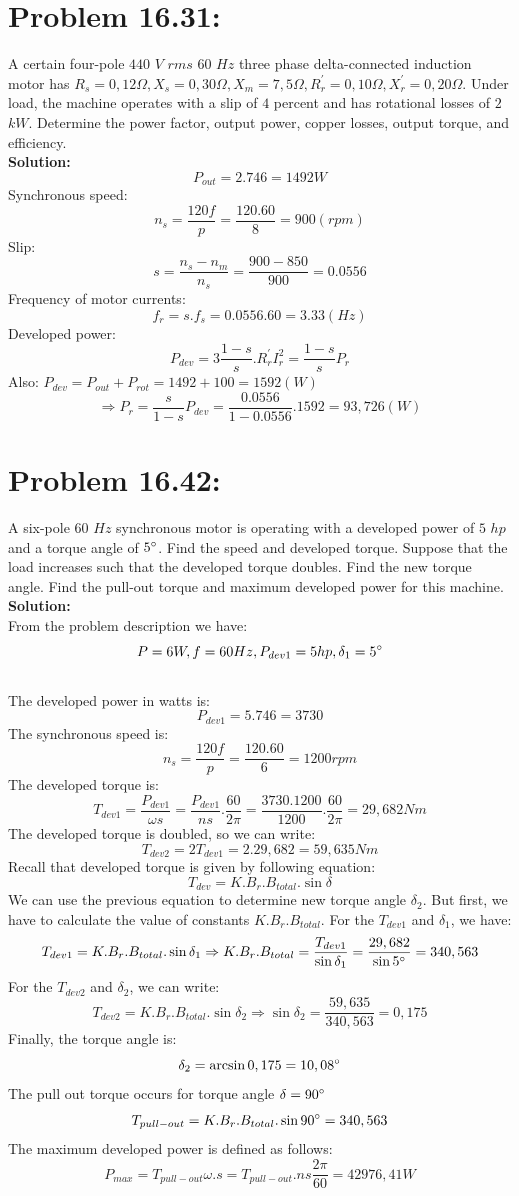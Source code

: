 \documentclass[9pt]{extarticle}
\begin{document}
\section*{Problem 16.31:}
A certain four-pole $440$ $V$ $rms$ $60$ $Hz$ three
phase delta-connected induction motor has
 $R_{s} = 0,12\Omega, X_{s} = 0,30\Omega,X_{m} = 7,5\Omega,R_{r}^{'} = 0,10\Omega,
 X_{r}^{'}= 0,20 \Omega$.
 Under load, the machine operates with a 
slip of $4$ percent and has rotational losses of 
$2$ $kW$. Determine the power factor, output 
power, copper losses, output torque, and 
efficiency.
\\ \textbf{Solution:}
$$P_{out}=2.746=1492W$$
Synchronous speed:
$$n_{s}=\frac{120f}{p}=\frac{120.60}{8}=900(rpm)$$
Slip:
$$s=\frac{n_{s}-n_{m}}{n_{s}}=\frac{900-850}{900}=0.0556$$
Frequency of motor currents:
$$f_{r}=s.f_{s}=0.0556.60=3.33 (Hz)$$
Developed power:
$$P_{dev}=3\frac{1-s}{s}.R_{r}^{'}I_{r}^{2}=\frac{1-s}{s}P_{r}$$
Also: $P_{dev}=P_{out}+P_{rot}=1492+100=1592 (W)$
$$\Rightarrow P_{r}=\frac{s}{1-s}P_{dev}=\frac{0.0556}{1-0.0556}.1592=93,726(W)$$
\section*{Problem 16.42:}
A six-pole $60$ $Hz$ synchronous motor is operating with a developed power of $5$ $hp$ and a torque angle of $5 \degree$. 
Find the speed and developed torque. Suppose that the load increases such that the developed torque doubles.
Find the new torque angle. Find the pull-out torque and maximum developed power for this machine.
\\ \textbf{Solution:}
\\ From the problem description we have:
$$P=6W, f=60 Hz, P_{dev1}=5hp, \delta_{1}=5\degree$$
\\The developed power in watts is:
$$P_{dev1}=5.746=3730$$
The synchronous speed is:
$$n_{s}=\frac{120f}{p}=\frac{120.60}{6}=1200 rpm$$
The developed torque is:
$$T_{dev1}=\frac{P_{dev1}}{\omega s}=\frac{P_{dev1}}{ns}.\frac{60}{2\pi}=\frac{3730.1200}{1200}.\frac{60}{2\pi}=29,682 Nm$$
The developed torque is doubled, so we can write:
$$T_{dev2}=2T_{dev1}=2.29,682=59,635 Nm$$
Recall that developed torque is given by following equation:
$$T_{dev}=K.B_{r}.B_{total}.\sin{\delta}$$
We can use the previous equation to determine new torque angle $\delta_{2}$. But first, we have to calculate the value of constants $K.B_{r}.B_{total}$.
For the $T_{dev1}$ and $\delta_{1}$, we have:
$$T_{dev1}=K.B_{r}.B_{total}.\sin{\delta_{1}}\Rightarrow K.B_{r}.B_{total}=\frac{T_{dev1}}{\sin{\delta_{1}}}=\frac{29,682}{\sin{5\degree}}=340,563$$
For the $T_{dev2}$ and $\delta_{2}$, we can write:
$$T_{dev2}=K.B_{r}.B_{total}.\sin{\delta_{2}}\Rightarrow \sin{\delta_{2}}=\frac{59,635}{340,563}=0,175$$
Finally, the torque angle is:
$$\delta_{2}=\arcsin{0,175}=10,08\degree$$
The pull out torque occurs for torque angle $\delta=90\degree$
$$T_{pull-out}=K.B_{r}.B_{total}.\sin{90\degree}=340,563$$
The maximum developed power is defined as follows:
$$P_{max}=T_{pull-out}\omega.s=T_{pull-out}.ns\frac{2\pi}{60}=42976,41 W$$
\end{document}
